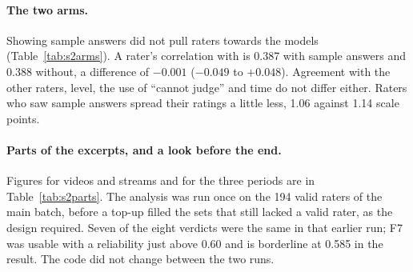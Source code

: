 \begin{table}[!htb]\centering
\caption{The two arms, with raters as the unit: 105 raters who saw sample answers after the practice excerpts and
106 who saw their own answers only. Differences with 95\% intervals.}\label{tab:s2arms}

\end{table}

\paragraph{The two arms.} Showing sample answers did not pull raters towards the models (Table~\ref{tab:s2arms}).
A rater's correlation with \jev{} is 0.387 with sample answers and 0.388 without, a difference of $-0.001$
($-0.049$ to $+0.048$). Agreement with the other raters, level, the use of ``cannot judge'' and time do not differ
either. Raters who saw sample answers spread their ratings a little less, 1.06 against 1.14 scale points.

\paragraph{Parts of the excerpts, and a look before the end.} Figures for videos and streams and for the three
periods are in Table~\ref{tab:s2parts}. The analysis was run once on the 194 valid raters of the main batch,
before a top-up filled the sets that still lacked a valid rater, as the design required. Seven of the eight
verdicts were the same in that earlier run; F7 was usable with a reliability just above 0.60 and is borderline
at 0.585 in the result. The code did not change between the two runs.
